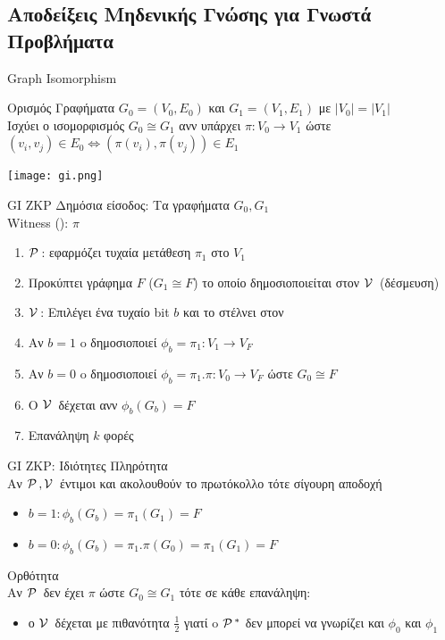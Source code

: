 \documentclass[10pt,handout]{beamer}
\begin{document}
\subsection{Αποδείξεις Μηδενικής Γνώσης για Γνωστά Προβλήματα}
\begin{frame}{Graph Isomorphism}
	\begin{block}{Ορισμός}
		Γραφήματα $G_0=(V_0,E_0)$ και $G_1=(V_1,E_1)$ με $|V_0| = |V_1|$ \\ \pause
		Ισχύει ο ισομορφισμός $G_0 \cong G_1$ ανν   
		υπάρχει $\pi :V_0 \rightarrow V_1 $ ώστε $(v_i,v_j) \in E_0 \Leftrightarrow (\pi(v_i),\pi(v_j)) \in E_1$ \pause 
\end{block}
\begin{center}
	\texttt{[image: gi.png]}
\end{center}
\end{frame}

\begin{frame}{GI ZKP}
	Δημόσια είσοδος: Τα γραφήματα $G_0,G_1$\\
	Witness (\prv): $\pi$
	\begin{enumerate}
	   \setlength \itemsep{0.1em}
	   \item $\mathcal{P}\,$: εφαρμόζει τυχαία μετάθεση $\pi_1$ στο $V_1$ 
	   \item Προκύπτει γράφημα $F$ ($G_1 \cong F$) το οποίο δημοσιοποιείται στον $\mathcal{V}\,$ (δέσμευση) \pause
	   \item $\mathcal{V}\,$: Eπιλέγει ένα τυχαίο bit $b$ και το στέλνει στον \prv \pause
	   \item  Αν $b=1$ o \prv δημοσιοποιεί $\phi_b = \pi_1: V_1 \rightarrow V_F$
	   \item  Αν $b=0$ o \prv δημοσιοποιεί $\phi_b = \pi_1 . \pi: V_0 \rightarrow V_F$ ώστε $G_0 \cong F$ \pause
	   \item O $\mathcal{V}\,$ δέχεται ανν $\phi_b(G_b) = F$
	   \item Επανάληψη $k$ φορές 
   \end{enumerate}	
\end{frame}

\begin{frame}{GI ZKP: Ιδιότητες}
	Πληρότητα\\
	Αν $\mathcal{P}\,, \mathcal{V}\,$ έντιμοι και ακολουθούν το πρωτόκολλο τότε σίγουρη αποδοχή
	\begin{itemize}
		\item $b=1: \phi_b(G_b) = \pi_1(G_1) = F$
		\item $b=0: \phi_b(G_b) = \pi_1 . \pi(G_0) = \pi_1(G_1) = F$
	\end{itemize} \pause
	Ορθότητα\\
	Αν $\mathcal{P}\,$ δεν έχει $\pi$ ώστε $G_0 \cong G_1$ τότε σε κάθε επανάληψη:
	\begin{itemize}
		\item ο $\mathcal{V}\,$ δέχεται με πιθανότητα $\frac{1}{2}$ γιατί o $\mathcal{P}\,^*$ δεν μπορεί να γνωρίζει και $\phi_0$ και $\phi_1$
	\end{itemize}   
\end{frame} 
\end{document}
